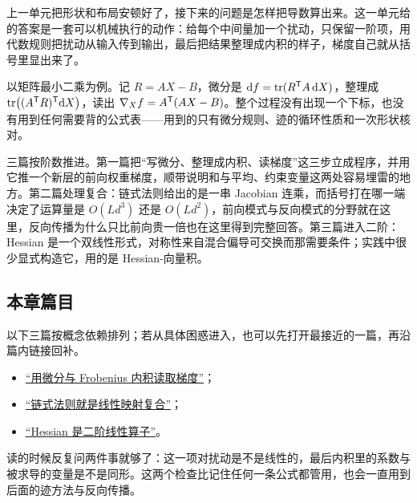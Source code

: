 上一单元把形状和布局安顿好了，接下来的问题是怎样把导数算出来。这一单元给的答案是一套可以机械执行的动作：给每个中间量加一个扰动，只保留一阶项，用代数规则把扰动从输入传到输出，最后把结果整理成内积的样子，梯度自己就从括号里显出来了。

以矩阵最小二乘为例。记 \(R=AX-B\)，微分是 \(\mathrm df=\operatorname{tr}(R^{\mathsf{T}}A\,\mathrm dX)\)，整理成 \(\operatorname{tr}\bigl((A^{\mathsf{T}}R)^{\mathsf{T}}\mathrm dX\bigr)\)，读出 \(\nabla_Xf=A^{\mathsf{T}}(AX-B)\)。整个过程没有出现一个下标，也没有用到任何需要背的公式表——用到的只有微分规则、迹的循环性质和一次形状核对。

三篇按阶数推进。第一篇把``写微分、整理成内积、读梯度''这三步立成程序，并用它推一个新层的前向权重梯度，顺带说明和与平均、约束变量这两处容易埋雷的地方。第二篇处理复合：链式法则给出的是一串 Jacobian 连乘，而括号打在哪一端决定了运算量是 \(O(Ld^3)\) 还是 \(O(Ld^2)\)，前向模式与反向模式的分野就在这里，反向传播为什么只比前向贵一倍也在这里得到完整回答。第三篇进入二阶：Hessian 是一个双线性形式，对称性来自混合偏导可交换而那需要条件；实践中很少显式构造它，用的是 Hessian-向量积。

\subsection{本章篇目}

以下三篇按概念依赖排列；若从具体困惑进入，也可以先打开最接近的一篇，再沿篇内链接回补。

\begin{itemize}
\tightlist
\item \hyperref[sec:10-Matrix-Calculus/02-Differentials/01]{``用微分与 Frobenius 内积读取梯度''}；
\item \hyperref[sec:10-Matrix-Calculus/02-Differentials/02]{``链式法则就是线性映射复合''}；
\item \hyperref[sec:10-Matrix-Calculus/02-Differentials/03]{``Hessian 是二阶线性算子''}。
\end{itemize}

读的时候反复问两件事就够了：这一项对扰动是不是线性的，最后内积里的系数与被求导的变量是不是同形。这两个检查比记住任何一条公式都管用，也会一直用到后面的迹方法与反向传播。
